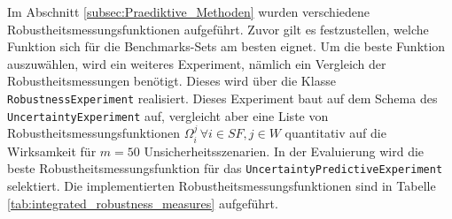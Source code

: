 Im Abschnitt \ref{subsec:Praediktive_Methoden} wurden verschiedene Robustheitsmessungsfunktionen aufgeführt. Zuvor gilt es festzustellen, welche Funktion sich für die Benchmarks-Sets am besten eignet. Um die beste Funktion auszuwählen, wird ein weiteres Experiment, nämlich ein Vergleich der Robustheitsmessungen benötigt. Dieses wird über die Klasse \lstinline|RobustnessExperiment| realisiert. Dieses Experiment baut auf dem Schema des \lstinline|UncertaintyExperiment| auf, vergleicht aber eine Liste von Robustheitsmessungsfunktionen $\Omega_i^j \, \forall i \in SF, j \in W$ quantitativ  auf die Wirksamkeit für $m = 50$ Unsicherheitsszenarien. In der Evaluierung wird die beste Robustheitsmessungsfunktion für das \lstinline|UncertaintyPredictiveExperiment| selektiert. Die implementierten Robustheitsmessungsfunktionen sind in Tabelle \ref{tab:integrated_robustness_measures} aufgeführt.

